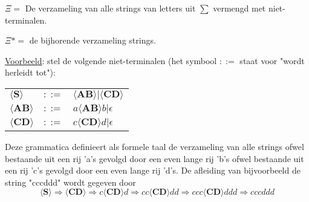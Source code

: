 \documentclass{report}
\begin{document}
$\Xi = $ De verzameling van alle strings van letters uit $\sum$ vermengd met niet-terminalen.

$\Xi* = $ de bijhorende verzameling strings.

\underline{Voorbeeld}: stel de volgende niet-terminalen (het symbool $::=$ staat voor "wordt herleidt tot"):
\begin{table}[ht]
	\centering
	\begin{tabular}{l l l}
		$\langle \textbf{S} \rangle$ & $::=$ & $\langle \textbf{AB} \rangle | \langle \textbf{CD} \rangle$ \\
		$\langle \textbf{AB} \rangle$ & $::=$ & $a\langle \textbf{AB} \rangle b | \epsilon$ \\
		$\langle \textbf{CD} \rangle$ & $::=$ & $c\langle \textbf{CD} \rangle d | \epsilon$ \\
	\end{tabular}
\end{table}
Deze grammatica definieert als formele taal de verzameling van alle strings ofwel bestaande uit een rij 'a's gevolgd door een even lange rij 'b's ofwel bestaande uit een rij 'c's gevolgd door een even lange rij 'd's. De afleiding van bijvoorbeeld de string "cccddd" wordt gegeven door
$$\langle \textbf{S} \rangle \Rightarrow  \langle \textbf{CD} \rangle  \Rightarrow  c\langle \textbf{CD} \rangle d
\Rightarrow  cc\langle \textbf{CD} \rangle dd \Rightarrow  ccc\langle \textbf{CD} \rangle ddd \Rightarrow  cccddd$$
\end{document}
